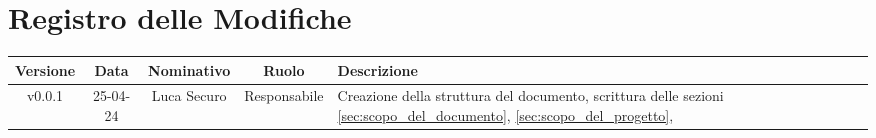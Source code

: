 \section*{\Large Registro delle Modifiche}
    \begin{table}[h]
        \centering
        \renewcommand\tabularxcolumn[1]{m{#1}} %
        \renewcommand{\arraystretch}{1.5}
        \begin{tabularx}{0.98\textwidth}
            {c|c|c|c|>{\centering\arraybackslash}X}
            \rowcolor{black}
            \textbf{\color{white} Versione} & \textbf{\color{white} Data} & \textbf{\color{white} Nominativo} & \textbf{\color{white} Ruolo} & \textbf{\color{white} Descrizione} \\ 
            \hline

            
            
            v0.0.1 & 25-04-24 & Luca Securo & Responsabile & Creazione della struttura del documento, scrittura delle sezioni \ref{sec:scopo_del_documento}, 
                                                             \ref{sec:scopo_del_progetto},\\
            
            
            
               
            
            \hline
        \end{tabularx}
    \end{table}